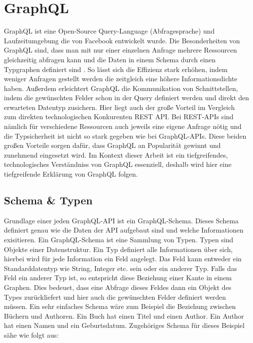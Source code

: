\section{GraphQL}

GraphQL ist eine Open-Source Query-Language (Abfragesprache) und Laufzeitumgebung die von Facebook entwickelt wurde. \cite[vgl. Introduction]{graphqlspecification}
Die Besonderheiten von GraphQL sind, dass man mit nur einer einzelnen Anfrage mehrere Ressourcen gleichzeitig abfragen kann \cite[vgl. No More Over- and Underfetching]{howtographql} und die
Daten in einem Schema durch einen Typgraphen definiert sind \cite[vgl. Benefits of a Schema & Type System]{howtographql}.
So lässt sich die Effizienz stark erhöhen, indem weniger Anfragen
gestellt werden die zeitgleich eine höhere Informationsdichte haben.
Außerdem erleichtert GraphQL die Kommunikation von Schnittstellen, indem die gewünschten Felder schon in der Query definiert werden
und direkt den erwarteten Datentyp zusichern.
Hier liegt auch der große Vorteil im Vergleich zum direkten technologischen Konkurenten REST API.
Bei REST-APIs sind nämlich für verschiedene Ressourcen auch jeweils eine eigene Anfrage nötig und die Typsicherheit ist nicht so stark gegeben
wie bei GraphQL-APIs. \cite[vgl. No More Over- and Underfetching]{howtographql}
Diese beiden großen Vorteile sorgen dafür, dass GraphQL an Popularität gewinnt und zunehmend eingesetzt wird.
Im Kontext dieser Arbeit ist ein tiefgreifendes, technologisches Verständniss von GraphQL essenziell, deshalb wird hier
eine tiefgreifende Erklärung von GraphQL folgen.

\subsection{Schema \& Typen}

Grundlage einer jeden GraphQL-API ist ein GraphQL-Schema. \cite[vgl. Core Concepts]{graphqlspecification}
Dieses Schema definiert genau wie die Daten der API aufgebaut sind und welche Informationen exisitieren.
Ein GraphQL-Schema ist eine Sammlung von Typen.
Typen sind Objekte einer Datenstruktur.
Ein Typ definiert alle Informationen über sich, hierbei wird für jede Information ein Feld angelegt.
Das Feld kann entweder ein Standarddatentyp wie String, Integer etc. sein oder ein anderer Typ.
Falls das Feld ein anderer Typ ist, so entspricht diese Beziehung einer Kante in einem Graphen.
Dies bedeuet, dass eine Abfrage dieses Feldes dann ein Objekt des Types zurückliefert und hier auch die gewünschten Felder
definiert werden müssen.
Ein sehr einfaches Schema wäre zum Beispiel die Beziehung zwischen Büchern und Authoren.
Ein Buch hat einen Titel und einen Author.
Ein Author hat einen Namen und ein Geburtsdatum.
Zugehöriges Schema für dieses Beispiel sähe wie folgt aus:

